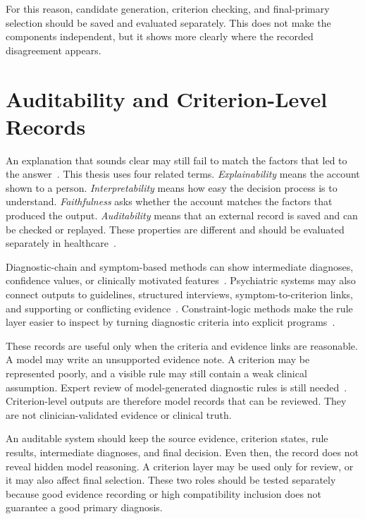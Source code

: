 \documentclass[12pt,a4paper,oneside]{report}
\begin{document}
For this reason, candidate generation, criterion checking, and final-primary selection should be saved and evaluated separately. This does not make the components independent, but it shows more clearly where the recorded disagreement appears.

\section{Auditability and Criterion-Level Records}
\label{sec:auditability-definition}

An explanation that sounds clear may still fail to match the factors that led to the answer~\citep{turpin2023unfaithful}. This thesis uses four related terms. \emph{Explainability} means the account shown to a person. \emph{Interpretability} means how easy the decision process is to understand. \emph{Faithfulness} asks whether the account matches the factors that produced the output. \emph{Auditability} means that an external record is saved and can be checked or replayed. These properties are different and should be evaluated separately in healthcare~\citep{rudin2019stop,huang2024xiai}.

Diagnostic-chain and symptom-based methods can show intermediate diagnoses, confidence values, or clinically motivated features~\citep{chen2025cod,lee2026interpretable,lyu2026depllm}. Psychiatric systems may also connect outputs to guidelines, structured interviews, symptom-to-criterion links, and supporting or conflicting evidence~\citep{li2026mind,bi2025magi,ozgun2025dsm5agentflow}. Constraint-logic methods make the rule layer easier to inspect by turning diagnostic criteria into explicit programs~\citep{kim2025clp}.

These records are useful only when the criteria and evidence links are reasonable. A model may write an unsupported evidence note. A criterion may be represented poorly, and a visible rule may still contain a weak clinical assumption. Expert review of model-generated diagnostic rules is still needed~\citep{kim2025clp}. Criterion-level outputs are therefore model records that can be reviewed. They are not clinician-validated evidence or clinical truth.

An auditable system should keep the source evidence, criterion states, rule results, intermediate diagnoses, and final decision. Even then, the record does not reveal hidden model reasoning. A criterion layer may be used only for review, or it may also affect final selection. These two roles should be tested separately because good evidence recording or high compatibility inclusion does not guarantee a good primary diagnosis.
\end{document}

